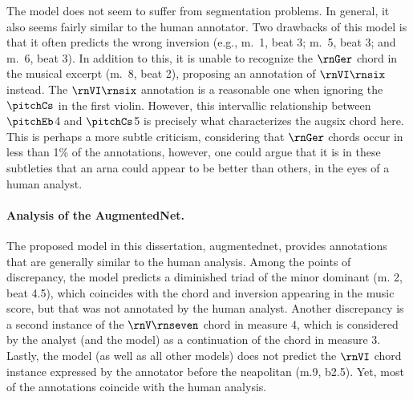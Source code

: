 The \textcite{mcleod2021modular} model does not seem to
suffer from segmentation problems. In general, it also seems
fairly similar to the human annotator. Two drawbacks of this
model is that it often predicts the wrong inversion (e.g.,
m.~1, beat 3; m.~5, beat 3; and m.~6, beat 3). In addition
to this, it is unable to recognize the $\rnGer$ chord in the
musical excerpt (m.~8, beat 2), proposing an annotation of
$\rnVI\rnsix$ instead. The $\rnVI\rnsix$ annotation is a
reasonable one when ignoring the $\pitchCs$ in the first
violin. However, this intervallic relationship between
$\pitchEb$4 and $\pitchCs$5 is precisely what characterizes
the \gls{augsix} chord here. This is perhaps a more subtle
criticism, considering that $\rnGer$ chords occur in less
than 1\% of the annotations, however, one could argue that
it is in these subtleties that an \gls{arna} could appear to
be better than others, in the eyes of a human analyst.

\paragraph{Analysis of the AugmentedNet.}

The proposed model in this dissertation, \gls{augmentednet},
provides annotations that are generally similar to the human
analysis. Among the points of discrepancy, the model
predicts a diminished triad of the minor dominant (m. 2,
beat 4.5), which coincides with the chord and inversion
appearing in the music score, but that was not annotated by
the human analyst. Another discrepancy is a second instance
of the $\rnV\rnseven$ chord in measure 4, which is
considered by the analyst (and the
\textcite{mcleod2021modular} model) as a continuation of the
chord in measure 3. Lastly, the model (as well as all other
models) does not predict the $\rnVI$ chord instance
expressed by the annotator before the \gls{neapolitan} (m.9,
b2.5). Yet, most of the annotations coincide with the human
analysis.

